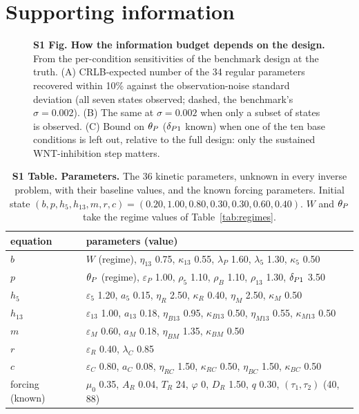 \section*{Supporting information}


\begin{figure}[h]
\centering
{}
\caption{\textbf{S1 Fig. How the information budget depends on the design.} From
the per-condition sensitivities of the benchmark design at the truth. (A)
CRLB-expected number of the 34 regular parameters recovered within 10\% against
the observation-noise standard deviation (all seven states observed; dashed,
the benchmark's $\sigma=0.002$). (B) The same at $\sigma=0.002$ when only a
subset of states is observed. (C) Bound on $\theta_P$ ($\delta_{P1}$ known) when one of the
ten base conditions is left out, relative to the full design: only the
sustained WNT-inhibition step matters.}
\label{fig:S1}
\end{figure}

\begin{table}[h]
\centering\footnotesize
\caption{\textbf{S1 Table. Parameters.} The 36 kinetic parameters, unknown in
every inverse problem, with their baseline values, and the known forcing
parameters. Initial state $(b,p,h_5,h_{13},m,r,c)=(0.20, 1.00, 0.80, 0.30, 0.30,
0.60, 0.40)$. $W$ and $\theta_P$ take the regime values of Table~\ref{tab:regimes}.}
\label{tab:params}
\begin{tabular}{ll}
\toprule
equation & parameters (value) \\
\midrule
$b$ & $W$ (regime), $\eta_{13}$ 0.75, $\kappa_{13}$ 0.55, $\lambda_P$ 1.60, $\lambda_5$ 1.30, $\kappa_5$ 0.50 \\
$p$ & $\theta_P$ (regime), $\varepsilon_P$ 1.00, $\rho_5$ 1.10, $\rho_B$ 1.10, $\rho_{13}$ 1.30, $\delta_{P1}$ 3.50 \\
$h_5$ & $\varepsilon_5$ 1.20, $a_5$ 0.15, $\eta_R$ 2.50, $\kappa_R$ 0.40, $\eta_M$ 2.50, $\kappa_M$ 0.50 \\
$h_{13}$ & $\varepsilon_{13}$ 1.00, $a_{13}$ 0.18, $\eta_{B13}$ 0.95, $\kappa_{B13}$ 0.50, $\eta_{M13}$ 0.55, $\kappa_{M13}$ 0.50 \\
$m$ & $\varepsilon_M$ 0.60, $a_M$ 0.18, $\eta_{BM}$ 1.35, $\kappa_{BM}$ 0.50 \\
$r$ & $\varepsilon_R$ 0.40, $\lambda_C$ 0.85 \\
$c$ & $\varepsilon_C$ 0.80, $a_C$ 0.08, $\eta_{RC}$ 1.50, $\kappa_{RC}$ 0.50, $\eta_{BC}$ 1.50, $\kappa_{BC}$ 0.50 \\
forcing (known) & $\mu_0$ 0.35, $A_R$ 0.04, $T_R$ 24, $\varphi$ 0, $D_R$ 1.50, $q$ 0.30, $(\tau_1,\tau_2)$ (40, 88) \\
\bottomrule
\end{tabular}
\end{table}

